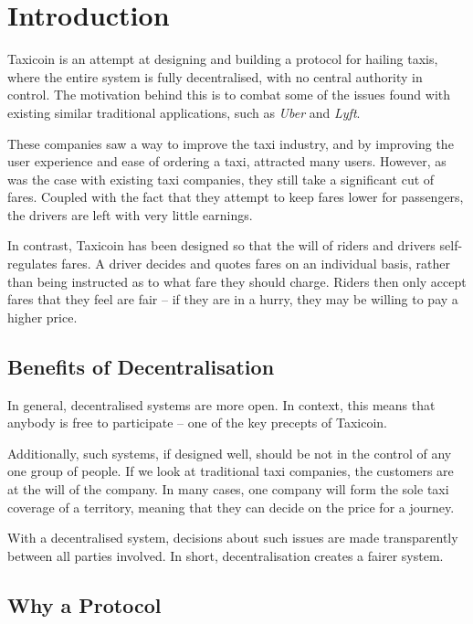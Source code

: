 \section{Introduction}

Taxicoin is an attempt at designing and building a protocol for hailing taxis, where the entire system is fully decentralised, with no central authority in control. The motivation behind this is to combat some of the issues found with existing similar traditional applications, such as \textit{Uber} and \textit{Lyft}.

These companies saw a way to improve the taxi industry, and by improving the user experience and ease of ordering a taxi, attracted many users. However, as was the case with existing taxi companies, they still take a significant cut of fares. Coupled with the fact that they attempt to keep fares lower for passengers, the drivers are left with very little earnings.

In contrast, Taxicoin has been designed so that the will of riders and drivers self-regulates fares. A driver decides and quotes fares on an individual basis, rather than being instructed as to what fare they should charge. Riders then only accept fares that they feel are fair -- if they are in a hurry, they may be willing to pay a higher price.

\subsection{Benefits of Decentralisation}

In general, decentralised systems are more open. In context, this means that anybody is free to participate -- one of the key precepts of Taxicoin.

Additionally, such systems, if designed well, should be not in the control of any one group of people. If we look at traditional taxi companies, the customers are at the will of the company. In many cases, one company will form the sole taxi coverage of a territory, meaning that they can decide on the price for a journey.

With a decentralised system, decisions about such issues are made transparently between all parties involved. In short, decentralisation creates a fairer system.

\subsection{Why a Protocol}

